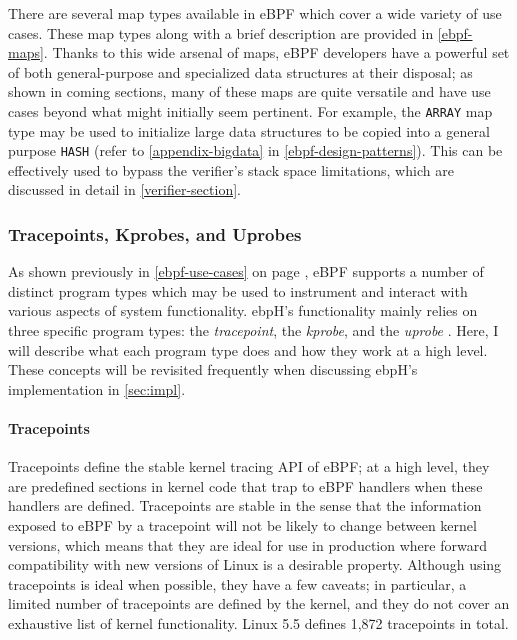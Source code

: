 \documentclass[
  12pt]{findlay}
\newcommand{\passthrough}[1]{#1}
\begin{document}
There are several map types available in eBPF which cover a wide variety
of use cases. These map types along with a brief description are
provided in \autoref{ebpf-maps}. Thanks to this wide arsenal of maps,
eBPF developers have a powerful set of both general-purpose and
specialized data structures at their disposal; as shown in coming
sections, many of these maps are quite versatile and have use cases
beyond what might initially seem pertinent. For example, the
\passthrough{\lstinline!ARRAY!} map type may be used to initialize large
data structures to be copied into a general purpose
\passthrough{\lstinline!HASH!} (refer to \autoref{appendix-bigdata} in
\autoref{ebpf-design-patterns}). This can be effectively used to bypass
the verifier's stack space limitations, which are discussed in detail in
\autoref{verifier-section}.

\hypertarget{tracepoints-kprobes-and-uprobes}{%
\subsubsection{Tracepoints, Kprobes, and
Uprobes}\label{tracepoints-kprobes-and-uprobes}}

As shown previously in \autoref{ebpf-use-cases} on page
\pageref{ebpf-use-cases}, eBPF supports a number of distinct program
types which may be used to instrument and interact with various aspects
of system functionality. ebpH's functionality mainly relies on three
specific program types: the \emph{tracepoint}, the \emph{kprobe}, and
the \emph{uprobe} \autocite{gregg19bpf,bcc}. Here, I will describe what
each program type does and how they work at a high level. These concepts
will be revisited frequently when discussing ebpH's implementation in
\autoref{sec:impl}.

\hypertarget{tracepoints}{%
\paragraph{Tracepoints}\label{tracepoints}}

Tracepoints \autocite{gregg19bpf} define the stable kernel tracing API
of eBPF; at a high level, they are predefined sections in kernel code
that trap to eBPF handlers when these handlers are defined. Tracepoints
are stable in the sense that the information exposed to eBPF by a
tracepoint will not be likely to change between kernel versions, which
means that they are ideal for use in production where forward
compatibility with new versions of Linux is a desirable property.
Although using tracepoints is ideal when possible, they have a few
caveats; in particular, a limited number of tracepoints are defined by
the kernel, and they do not cover an exhaustive list of kernel
functionality. Linux 5.5 defines 1,872 tracepoints in total.
\end{document}
